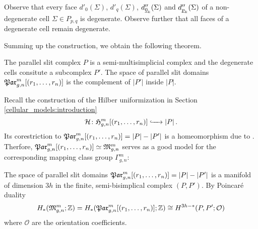 \begin{rem}
    Observe that every face $d'_0(\Sigma)$, $d'_q(\Sigma)$, $d''_{\underline{\smash{0}}_k}(\Sigma)$ and $d''_{\underline{\smash{p}}_k}(\Sigma)$ of a non-degenerate cell $\Sigma \in P_{p,q}$ is degenerate.
    Observe further that all faces of a degenerate cell remain degenerate.
\end{rem}

Summing up the construction, we obtain the following theorem.
\begin{thm}
    The parallel slit complex $P$ is a semi-multisimplicial complex and the degenerate cells consitute a subcomplex $P'$.
    The space of parallel slit domains $\Parr$ is the complement of $|P'|$ inside $|P|$.
\end{thm}

Recall the construction of the Hilber uniformization in Section \ref{cellular_models:introduction}
\[
    \mathcal H \colon \Harmr \xhr{} |P| \,.
\]
Its corestriction to $\Parr = |P| - |P'|$ is a homeomorphism due to \cite{Boedigheimer19901}.
Therfore, $\Parr \simeq \Modspc$ serves as a good model for the corresponding mapping class group $\Gamma_{g,n}^m$:
\begin{thm}
    \label{cellular_models:parallel:parallel_slit_complex_serves_as_model}
    The space of parallel slit domains $\Parr = |P| - |P'|$ is a manifold of dimension $3h$ in the finite, semi-bisimplical complex $(P,P')$.
    By Poincaré duality
    \[
        H_\ast( \Modspc; \mathbb Z ) = H_\ast( \Parr; \mathbb Z ) \cong H^{3h-\ast}( P, P'; \mathcal O)
    \]
    where $\mathcal O$ are the orientation coefficients.
\end{thm}
